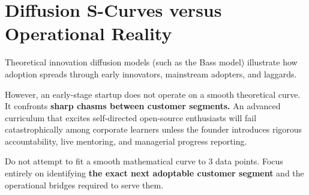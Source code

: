 \section{Diffusion S-Curves versus Operational Reality}

Theoretical innovation diffusion models (such as the Bass model) illustrate how adoption spreads through early innovators, mainstream adopters, and laggards.

However, an early-stage startup does not operate on a smooth theoretical curve. It confronts \textbf{sharp chasms between customer segments.} An advanced curriculum that excites self-directed open-source enthusiasts will fail catastrophically among corporate learners unless the founder introduces rigorous accountability, live mentoring, and managerial progress reporting.

Do not attempt to fit a smooth mathematical curve to 3 data points. Focus entirely on identifying \textbf{the exact next adoptable customer segment} and the operational bridges required to serve them.
